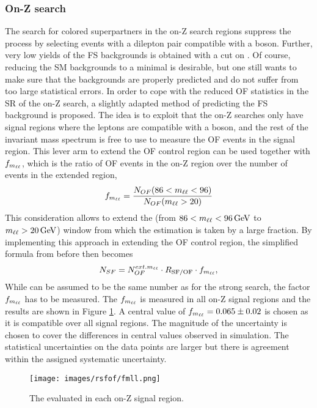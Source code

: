\subsubsection*{On-Z search}
\noindent\justify
The search for colored superpartners in the on-Z search regions suppress the \ttbar process by selecting events with a dilepton pair compatible with a \PZ boson.
Further, very low yields of the FS backgrounds is obtained with a cut on \mttwo.
Of course, reducing the SM backgrounds to a minimal is desirable, but one still wants to make sure that the backgrounds are properly predicted and do not suffer from too large statistical errors.
In order to cope with the reduced OF statistics in the SR of the on-Z search, a slightly adapted method of predicting the FS background is proposed.
The idea is to exploit that the on-Z searches only have signal regions where the leptons are compatible with a \PZ boson, and the rest of the invariant mass spectrum is free to use to measure the OF events in the signal region.
This lever arm to extend the OF control region can be used together with $f_{m_{\ell\ell}}$, which is the ratio of OF events in the on-Z region over the number of events in the extended \mll region,
\begin{equation}
f_{m_{\ell\ell}}=\frac{N_{OF}(86<m_{\ell\ell}<96)}{N_{OF}(m_{\ell\ell}>20)}
\end{equation}
This consideration allows to extend the \mll (from $86<m_{\ell\ell}<96\,\text{Ge\hspace{-.08em}V}$ to $m_{\ell\ell}>20\,\text{Ge\hspace{-.08em}V}$) window from which the estimation is taken by a large fraction.
By implementing this approach in extending the OF control region, the simplified formula from before then becomes
\begin{equation}
\label{eq:estFSEwk}
    N_{SF} = N_{OF}^{ext.m_{\ell\ell}} \cdot R_{\text{SF/OF}} \cdot f_{m_{\ell\ell}},
\end{equation}
While \Rsfof can be assumed to be the same number as for the strong search, the factor $f_{m_{\ell\ell}}$ has to be measured.
The $f_{m_{\ell\ell}}$ is measured in all on-Z signal regions and the results are shown in Figure \ref{fig:fmll}. 
A central value of $f_{m_{\ell\ell}}=0.065\pm0.02$ is chosen as it is compatible over all signal regions.
The magnitude of the uncertainty is chosen to cover the differences in central values observed in simulation.
The statistical uncertainties on the data points are larger but there is agreement within the assigned systematic uncertainty.
\begin{figure}[htbp!]
\begin{center}
    \texttt{[image: images/rsfof/fmll.png]}
    \caption{The \fmll evaluated in each on-Z signal region.}
\label{fig:fmll}
\end{center}
\end{figure}
